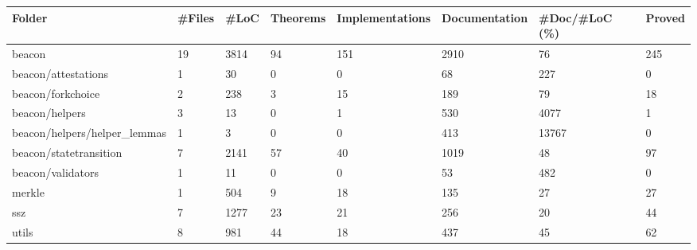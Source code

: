 \documentclass[a4paper, 12pt]{article}
\begin{document}
\vspace{2em}
\begin{tabular}{llllllll}
\toprule
                       Folder & \#Files &  \#LoC & Theorems & Implementations & Documentation & \#Doc/\#LoC (\%) & Proved \\
\midrule
                       beacon &     19 &  3814 &       94 &             151 &          2910 &            76 &    245 \\
          beacon/attestations &      1 &    30 &        0 &               0 &            68 &           227 &      0 \\
            beacon/forkchoice &      2 &   238 &        3 &              15 &           189 &            79 &     18 \\
               beacon/helpers &      3 &    13 &        0 &               1 &           530 &          4077 &      1 \\
 beacon/helpers/helper\_lemmas &      1 &     3 &        0 &               0 &           413 &         13767 &      0 \\
       beacon/statetransition &      7 &  2141 &       57 &              40 &          1019 &            48 &     97 \\
            beacon/validators &      1 &    11 &        0 &               0 &            53 &           482 &      0 \\
                       merkle &      1 &   504 &        9 &              18 &           135 &            27 &     27 \\
                          ssz &      7 &  1277 &       23 &              21 &           256 &            20 &     44 \\
                        utils &      8 &   981 &       44 &              18 &           437 &            45 &     62 \\
\bottomrule
\end{tabular}
\end{document}
